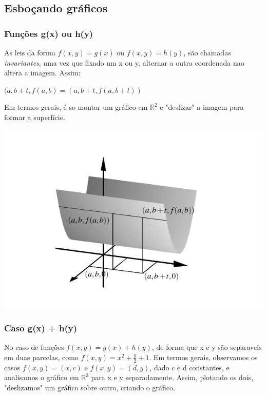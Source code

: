 \documentclass[letterpaper, 11pt]{article}
\begin{document}
\subsection{Esboçando gráficos}
\label{sec:org03b99ed}
\subsubsection{Funções g(x) ou h(y)}
\label{sec:org05c1eb2}
As leis da forma \(f(x,y) = g(x)\) ou \(f(x,y) = h(y)\), são chamadas \emph{invariantes}, uma vez que fixado um x ou y, alternar a outra coordenada nao altera a imagem. Assim:

\begin{center} $(a,b+t, f(a,b) = (a,b+t,f(a,b+t))$ \end{center}

Em termos gerais, é so montar um gráfico em \(\mathbb{R}^2\) e "deslizar" a imagem para formar a superfície.

\begin{center}
\includegraphics[width=.9\linewidth]{./img/esbocar1.png}
\end{center}

\subsubsection{Caso g(x) + h(y)}
\label{sec:org042b7be}
No caso de funções \(f(x,y) = g(x) + h(y)\), de forma que x e y são separaveis em duas parcelas, como \(f(x,y) = x^2+\frac{y}{2} + 1\). Em termos gerais, observamos os casos \(f(x,y) = (x,c)\) e
\(f(x,y) = (d,y)\), dado c e d constantes, e analisamos o gráfico em \(\mathbb{R}^2\) para x e y separadamente. Assim, plotando os dois, "deslizamos" um gráfico sobre outro, criando o gráfico.
\end{document}
